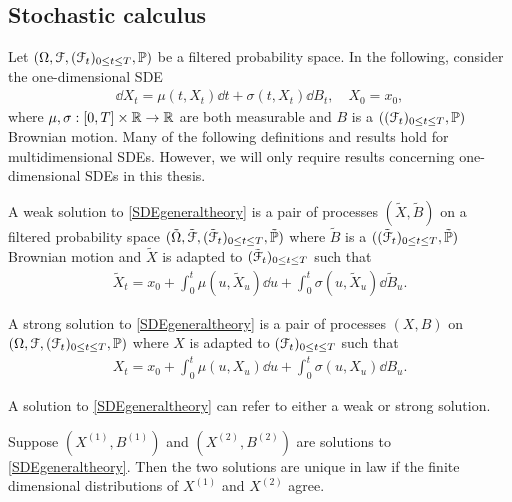 \subsection{Stochastic calculus} 
\label{sec:stochasticcalculus}
Let $(\Omega, \mathcal{F}, (\mathcal{F}_t)_{0 \leq t \leq T}, \mathbb{P})$ be a filtered probability space. In the following, consider the one-dimensional SDE
\begin{align}
	\dd X_t = \mu(t, X_t) \dd t + \sigma(t, X_t) \dd B_t, \quad X_0 = x_0, \label{SDEgeneraltheory}
\end{align}
where $\mu,\sigma: [0, T] \times \mathbb{R} \to \mathbb{R}$ are both measurable and $B$ is a $((\mathcal{F}_t)_{0 \leq t \leq T}, \mathbb{P})$ Brownian motion. Many of the following definitions and results hold for multidimensional SDEs. However, we will only require results concerning one-dimensional SDEs in this thesis.
\begin{definition}
\label{def:weaksolution}
A weak solution to \cref{SDEgeneraltheory} is a pair of processes $(\tilde X, \tilde B)$ on a filtered probability space $(\tilde \Omega, \tilde {\mathcal{F}}, (\tilde {\mathcal{F}}_t)_{0 \leq t \leq T}, \tilde {\mathbb{P}})$ where $\tilde B$ is a $((\tilde {\mathcal{F}}_t)_{0 \leq t \leq T}, \tilde {\mathbb{P}})$ Brownian motion  and $\tilde X$ is adapted to $(\tilde {\mathcal{F}}_t)_{0 \leq t \leq T}$ such that
\begin{align*}
	\tilde X_t = x_0 + \int_0^t \mu(u, \tilde X_u) \dd u + \int_0^t  \sigma(u, \tilde X_u) \dd \tilde B_u.
\end{align*}
\end{definition}
\begin{definition}
\label{def:strongsolution}
A strong solution to \cref{SDEgeneraltheory} is a pair of processes $(X,  B)$ on $( \Omega, \mathcal{F}, ( \mathcal{F}_t)_{0 \leq t \leq T}, \mathbb{P})$ where $X$ is adapted to $(\mathcal{F}_t)_{0 \leq t \leq T}$ such that
\begin{align*}
	X_t = x_0 + \int_0^t \mu(u, X_u) \dd u + \int_0^t  \sigma(u, X_u) \dd B_u.
\end{align*}
\end{definition}
\begin{remark}
A solution to \cref{SDEgeneraltheory} can refer to either a weak or strong solution.
\end{remark}
\begin{definition}
\label{def:uniqueinlaw}
Suppose $(X^{(1)}, B^{(1)})$ and $(X^{(2)}, B^{(2)})$ are solutions to \cref{SDEgeneraltheory}. Then the two solutions are unique in law if the finite dimensional distributions of $X^{(1)}$ and $X^{(2)}$ agree.
\end{definition}

